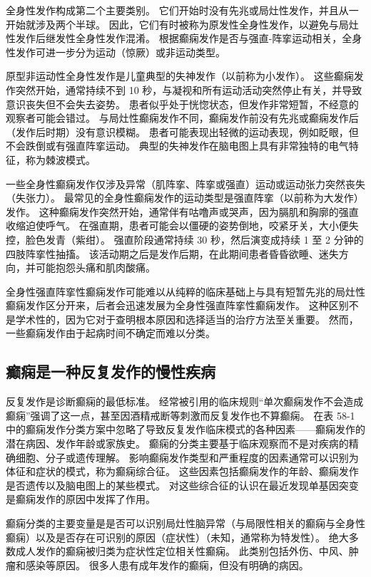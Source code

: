 全身性发作构成第二个主要类别。
它们开始时没有先兆或局灶性发作，并且从一开始就涉及两个半球。
因此，它们有时被称为原发性全身性发作，以避免与局灶性发作后继发性全身性发作混淆。
根据癫痫发作是否与强直-阵挛运动相关，全身性发作可进一步分为运动（惊厥）或非运动类型。


原型非运动性全身性发作是儿童典型的失神发作（以前称为小发作）。
这些癫痫发作突然开始，通常持续不到 10 秒，与凝视和所有运动活动突然停止有关，并导致意识丧失但不会失去姿势。
患者似乎处于恍惚状态，但发作非常短暂，不经意的观察者可能会错过。
与局灶性癫痫发作不同，癫痫发作前没有先兆或癫痫发作后（发作后时期）没有意识模糊。
患者可能表现出轻微的运动表现，例如眨眼，但不会跌倒或有强直阵挛运动。
典型的失神发作在脑电图上具有非常独特的电气特征，称为棘波模式。


一些全身性癫痫发作仅涉及异常（肌阵挛、阵挛或强直）运动或运动张力突然丧失（失张力）。
最常见的全身性癫痫发作的运动类型是强直阵挛（以前称为大发作）发作。
这种癫痫发作突然开始，通常伴有咕噜声或哭声，因为膈肌和胸廓的强直收缩迫使呼气。
在强直期，患者可能会以僵硬的姿势倒地，咬紧牙关，大小便失控，脸色发青（紫绀）。
强直阶段通常持续 30 秒，然后演变成持续 1 至 2 分钟的四肢阵挛性抽搐。
该活动期之后是发作后期，在此期间患者昏昏欲睡、迷失方向，并可能抱怨头痛和肌肉酸痛。


全身性强直阵挛性癫痫发作可能难以从纯粹的临床基础上与具有短暂先兆的局灶性癫痫发作区分开来，后者会迅速发展为全身性强直阵挛性癫痫发作。
这种区别不是学术性的，因为它对于查明根本原因和选择适当的治疗方法至关重要。
然而，一些癫痫发作由于起病时间不确定而难以分类。



\subsection{癫痫是一种反复发作的慢性疾病}

反复发作是诊断癫痫的最低标准。
经常被引用的临床规则“单次癫痫发作不会造成癫痫”强调了这一点，甚至因酒精戒断等刺激而反复发作也不算癫痫。
在表 58-1 中的癫痫发作分类方案中忽略了导致反复发作临床模式的各种因素——癫痫发作的潜在病因、发作年龄或家族史。
癫痫的分类主要基于临床观察而不是对疾病的精确细胞、分子或遗传理解。
影响癫痫发作类型和严重程度的因素通常可以识别为体征和症状的模式，称为癫痫综合征。
这些因素包括癫痫发作的年龄、癫痫发作是否遗传以及脑电图上的某些模式。
对这些综合征的认识在最近发现单基因突变是癫痫发作的原因中发挥了作用。


癫痫分类的主要变量是是否可以识别局灶性脑异常（与局限性相关的癫痫与全身性癫痫）以及是否存在可识别的原因（症状性）（未知，通常称为特发性）。
绝大多数成人发作的癫痫被归类为症状性定位相关性癫痫。
此类别包括外伤、中风、肿瘤和感染等原因。
很多人患有成年发作的癫痫，但没有明确的病因。


